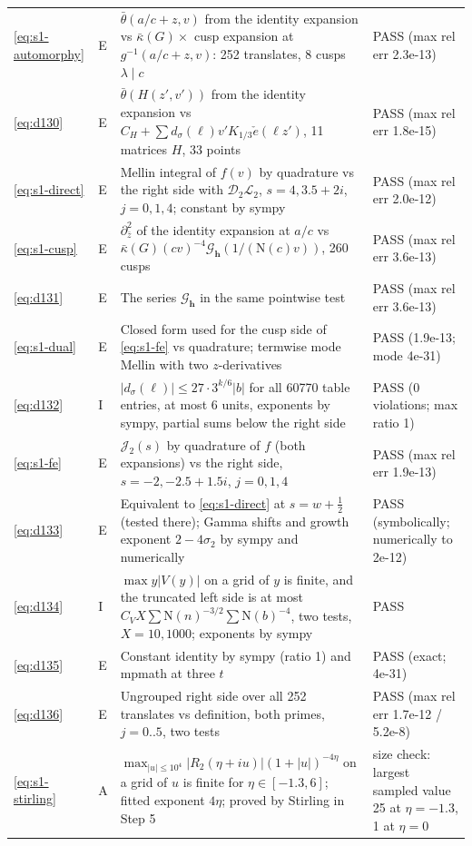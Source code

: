 \documentclass[11pt]{article}
\numberwithin{equation}{section}
\newcommand{\N}{\mathrm N}
\newcommand{\ce}{\check e}
\begin{document}
\begin{longtable}{@{}>{\raggedright\arraybackslash}p{1.2cm}>{\centering\arraybackslash}p{0.7cm}>{\raggedright\arraybackslash}p{9.05cm}>{\raggedright\arraybackslash}p{4.3cm}@{}}
\eqref{eq:s1-automorphy} & E & $\bar\theta(a/c+z,v)$ from the identity expansion vs $\bar\kappa(G)\times$ cusp expansion at $g^{-1}(a/c+z,v)$: 252 translates, 8 cusps $\lambda\mid c$ & PASS (max rel err 2.3e-13)\\
\eqref{eq:d130} & E & $\bar\theta(H(z',v'))$ from the identity expansion vs $C_H+\sum d_\sigma(\ell)v'K_{1/3}\ce(\ell z')$, 11 matrices $H$, 33 points & PASS (max rel err 1.8e-15)\\
\eqref{eq:s1-direct} & E & Mellin integral of $f(v)$ by quadrature vs the right side with $\mathcal D_2\mathcal L_2$, $s=4,3.5+2i$, $j=0,1,4$; constant by sympy & PASS (max rel err 2.0e-12)\\
\eqref{eq:s1-cusp} & E & $\partial_{\bar z}^2$ of the identity expansion at $a/c$ vs $\bar\kappa(G)(cv)^{-4}\mathcal G_{\mathbf h}(1/(\N(c)v))$, 260 cusps & PASS (max rel err 3.6e-13)\\
\eqref{eq:d131} & E & The series $\mathcal G_{\mathbf h}$ in the same pointwise test & PASS (max rel err 3.6e-13)\\
\eqref{eq:s1-dual} & E & Closed form used for the cusp side of \eqref{eq:s1-fe} vs quadrature; termwise mode Mellin with two $z$-derivatives & PASS (1.9e-13; mode 4e-31)\\
\eqref{eq:d132} & I & $|d_\sigma(\ell)|\le27\cdot3^{k/6}|b|$ for all 60770 table entries, at most 6 units, exponents by sympy, partial sums below the right side & PASS (0 violations; max ratio 1)\\
\eqref{eq:s1-fe} & E & $\mathcal J_2(s)$ by quadrature of $f$ (both expansions) vs the right side, $s=-2,-2.5+1.5i$, $j=0,1,4$ & PASS (max rel err 1.9e-13)\\
\eqref{eq:d133} & E & Equivalent to \eqref{eq:s1-direct} at $s=w+\frac12$ (tested there); Gamma shifts and growth exponent $2-4\sigma_2$ by sympy and numerically & PASS (symbolically; numerically to 2e-12)\\
\eqref{eq:d134} & I & $\max y|V(y)|$ on a grid of $y$ is finite, and the truncated left side is at most $C_VX\sum\N(n)^{-3/2}\sum\N(b)^{-4}$, two tests, $X=10,1000$; exponents by sympy & PASS\\
\eqref{eq:d135} & E & Constant identity by sympy (ratio 1) and mpmath at three $t$ & PASS (exact; 4e-31)\\
\eqref{eq:d136} & E & Ungrouped right side over all 252 translates vs definition, both primes, $j=0..5$, two tests & PASS (max rel err 1.7e-12 / 5.2e-8)\\
\eqref{eq:s1-stirling} & A & $\max_{|u|\le10^4}|R_2(\eta+iu)|(1+|u|)^{-4\eta}$ on a grid of $u$ is finite for $\eta\in[-1.3,6]$; fitted exponent $4\eta$; proved by Stirling in Step 5 & size check: largest sampled value 25 at $\eta=-1.3$, 1 at $\eta=0$\\

\end{longtable}
\end{document}
